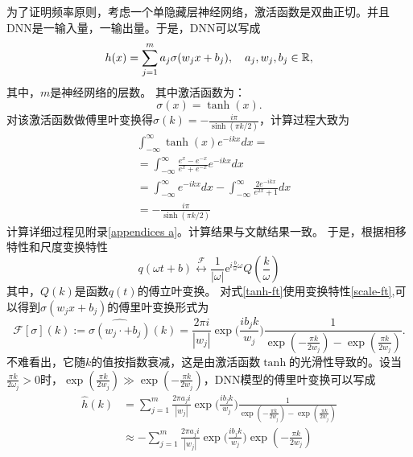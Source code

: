 为了证明频率原则，考虑一个单隐藏层神经网络，激活函数是双曲正切。并且DNN是一输入量，一输出量。于是，DNN可以写成
\begin{equation}
    h(x)=\sum_{j=1}^{m}a_{j}\sigma(w_{j}x+b_{j}),\quad a_{j},w_{j},b_{j}\in{\rm \mathbb{R}},\label{eq: DNNmath}
\end{equation}
其中，$m$是神经网络的层数。
其中激活函数为：
\begin{equation}\label{tanh}
    \sigma(x)=\tanh(x).
\end{equation}
对该激活函数做傅里叶变换得$\hat{\sigma}(k)=-\frac{i\pi}{\sinh(\pi k/2)}$\cite{bracewell1986fourier}，计算过程大致为
\begin{equation}\label{tanh-ft}
    \begin{aligned}
      &  \int_{-\infty }^{\infty } \tanh (x)e^{-ikx}dx= \\
&=\int_{-\infty}^{\infty} \frac{e^{x}-e^{-x}}{e^{x}+e^{-x}} e^{-i kx} d x \\
&=\int_{-\infty }^{\infty } e^{-ikx}dx-\int_{-\infty }^{\infty } \frac{2e^{-ikx}}{e^{2x}+1} dx \\
&=-\frac{i\pi}{\sinh(\pi k/2)}
\end{aligned}
\end{equation}
计算详细过程见附录\ref{appendices a}。计算结果与文献结果一致。
于是，根据相移特性和尺度变换特性\cite{刘树棠2010信号与系统}
\begin{equation}\label{scale-ft}
    q(\omega t+b) \stackrel{\mathcal{F}}{\longleftrightarrow} \frac{1}{|\omega|} \mathrm{e}^{i \frac{b}{\omega} \omega} Q\left(\frac{k}{\omega}\right)
\end{equation}
其中，$Q(k)$是函数$q(t)$的傅立叶变换。
对式\ref{tanh-ft}使用变换特性\ref{scale-ft},可以得到$\sigma(w_{j}x+b_{j})$的傅里叶变换形式为
\begin{equation}
    \mathcal{F}[\sigma](k):=\widehat{\sigma(w_{j}\cdot+b_{j})}(k)=\frac{2\pi i}{|w_{j}|}\exp\Big(\frac{i b_{j}k}{w_{j}}\Big)\frac{1}{\exp(-\frac{\pi k}{2w_{j}})-\exp(\frac{\pi k}{2w_{j}})}.\label{eq:FSigOri}
\end{equation}
不难看出，它随$k$的值按指数衰减，这是由激活函数$\tanh$的光滑性导致的。设当$\frac{\pi k}{2\omega_j}>0$时，$\exp(\frac{\pi k}{2w_{j}})\gg \exp(-\frac{\pi k}{2w_{j}})$，DNN模型的傅里叶变换可以写成
\begin{equation}
    \begin{aligned}
        \hat{h}(k)&=\sum_{j=1}^{m}\frac{2\pi a_{j}i}{|w_{j}|}\exp\Big(\frac{i b_{j}k}{w_{j}}\Big)\frac{1}{\exp(-\frac{\pi k}{2w_{j}})-\exp(\frac{\pi k}{2w_{j}})} \\
& \approx -\sum_{j=1}^{m}\frac{2\pi a_{j}i}{|w_{j}|}\exp\Big(\frac{i b_{j}k}{w_{j}}\Big)\exp(-\frac{\pi k}{2w_{j}})
\end{aligned}
\end{equation}
